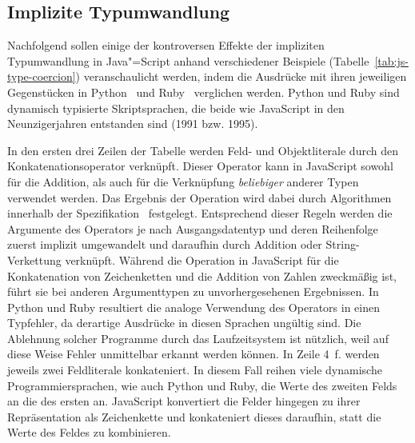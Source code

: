 \subsection{Implizite Typumwandlung}

Nachfolgend sollen einige der kontroversen Effekte der impliziten Typumwandlung in Java"=Script anhand verschiedener Beispiele (Tabelle~\ref{tab:js-type-coercion}) veranschaulicht werden, indem die Ausdrücke mit ihren jeweiligen Gegenstücken in Python~\autocite{PYTHON3} und Ruby~\autocite{RUBY} verglichen werden. Python und Ruby sind dynamisch typisierte Skriptsprachen, die beide wie JavaScript in den Neunzigerjahren entstanden sind (1991 bzw. 1995).

In den ersten drei Zeilen der Tabelle werden Feld- und Objektliterale durch den Konkatenationsoperator \code{+} verknüpft. Dieser Operator kann in JavaScript sowohl für die Addition, als auch für die Verknüpfung \emph{beliebiger} anderer Typen verwendet werden. Das Ergebnis der Operation wird dabei durch Algorithmen innerhalb der Spezifikation~\autocite[220]{ECMASCRIPT:2019} festgelegt. Entsprechend dieser Regeln werden die Argumente des Operators je nach Ausgangsdatentyp und deren Reihenfolge zuerst implizit umgewandelt und daraufhin durch Addition oder String-Verkettung verknüpft. Während die Operation in JavaScript für die Konkatenation von Zeichenketten und die Addition von Zahlen zweckmäßig ist, führt sie bei anderen Argumenttypen zu unvorhergesehenen Ergebnissen. In Python und Ruby resultiert die analoge Verwendung des Operators in einen Typfehler, da derartige Ausdrücke in diesen Sprachen ungültig sind. Die Ablehnung solcher Programme durch das Laufzeitsystem ist nützlich, weil auf diese Weise Fehler unmittelbar erkannt werden können.
In Zeile 4~f. werden jeweils zwei Feldliterale konkateniert. In diesem Fall reihen viele dynamische Programmiersprachen, wie auch Python und Ruby, die Werte des zweiten Felds an die des ersten an. JavaScript konvertiert die Felder hingegen zu ihrer Repräsentation als Zeichenkette und konkateniert dieses daraufhin, statt die Werte des Feldes zu kombinieren.



